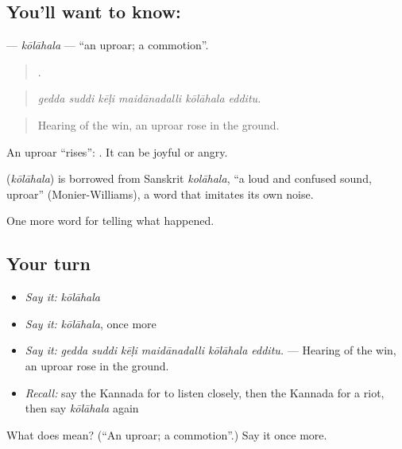 \subsection*{You'll want to know: }
\textbf{} — \emph{kōlāhala} — \textquotedblleft{}an uproar; a commotion\textquotedblright{}.

\begin{quote}
     .
\end{quote}

\begin{quote}
\emph{gedda suddi kēḷi maidānadalli kōlāhala edditu.}
\end{quote}

\begin{quote}
Hearing of the win, an uproar rose in the ground.
\end{quote}

An uproar \textquotedblleft{}rises\textquotedblright{}:  . It can be joyful or angry.

\begin{cousinweb}
\textbf{} (\emph{kōlāhala}) is borrowed from Sanskrit \emph{kolāhala}, \textquotedblleft{}a loud and confused sound, uproar\textquotedblright{} (Monier-Williams), a word that imitates its own noise.
\end{cousinweb}

\begin{grammarlens}[title={What you've built}]
One more word for telling what happened.
\end{grammarlens}

\subsection*{Your turn}
\begin{itemize}
\raggedright
  \item \emph{Say it:} \emph{kōlāhala}
  \item \emph{Say it:} \emph{kōlāhala}, once more
  \item \emph{Say it:} \emph{gedda suddi kēḷi maidānadalli kōlāhala edditu.} — Hearing of the win, an uproar rose in the ground.
  \item \emph{Recall:} say the Kannada for to listen closely, then the Kannada for a riot, then say \emph{kōlāhala} again
\end{itemize}

\begin{tcolorbox}[breakable,colback=teal!4,colframe=teal!35!black,title={Before you move on}]
What does  mean? (\textquotedblleft{}An uproar; a commotion\textquotedblright{}.) Say it once more.
\end{tcolorbox}
